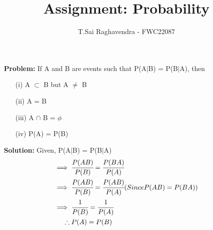 \documentclass{article}
\newcommand{\Problem}{\noindent \textbf{Problem: }}
\newcommand{\solution}{\noindent \textbf{Solution: }}
\begin{document}
\title{Assignment: Probability}
\author{\Large T.Sai Raghavendra - FWC22087}
\date{}


\maketitle

\Problem If A and B are events such that P(A$|$B) = P(B$|$A), then\\
\begin{enumerate}
\item[(i)] A $\subset$ B but A $\not=$ B
\item[(ii)] A = B
\item[(iii)] A $\cap$ B = $\phi$
\item[(iv)] P(A) = P(B)
\end{enumerate}

\solution
Given, P(A$|$B) = P(B$|$A)
\begin{align}
\implies& \; \cfrac{P(AB)}{P(B)} = \cfrac{P(BA)}{P(A)}\\ 
\implies& \; \cfrac{P(AB)}{P(B)} = \cfrac{P(AB)}{P(A)} (Since P(AB) = P(BA))\\
\implies& \; \cfrac{1}{P(B)} = \cfrac{1}{P(A)}\\
\therefore& \; P(A) = P(B)
\end{align}
\end{document}

